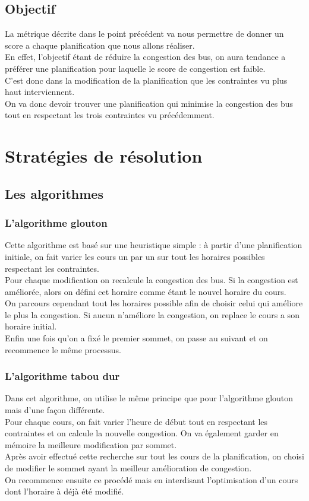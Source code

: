 \documentclass[a4paper,11pt]{article}
\begin{document}
	\subsection{Objectif}
		La métrique décrite dans le point précédent va nous permettre de donner un score a chaque planification que nous allons réaliser.\\
		En effet, l'objectif étant de réduire la congestion des bus, on aura tendance a préférer une planification pour laquelle le score de congestion est faible.\\
		C'est donc dans la modification de la planification que les contraintes vu plus haut interviennent.\\
		On va donc devoir trouver une planification qui minimise la congestion des bus tout en respectant les trois contraintes vu précédemment.
	
\section{Stratégies de résolution}
	\subsection{Les algorithmes}
		\subsubsection{L'algorithme glouton}
		Cette algorithme est basé sur une heuristique simple : à partir d'une planification initiale, on fait varier les cours un par un sur tout les horaires possibles respectant les contraintes.\\
		Pour chaque modification on recalcule la congestion des bus. Si la congestion est améliorée, alors on défini cet horaire comme étant le nouvel horaire du cours.\\
		On parcours cependant tout les horaires possible afin de choisir celui qui améliore le plus la congestion. Si aucun n'améliore la congestion, on replace le cours a son horaire initial.\\
		Enfin une fois qu'on a fixé le premier sommet, on passe au suivant et on recommence le même processus.
		\subsubsection{L'algorithme tabou dur}
		Dans cet algorithme, on utilise le même principe que pour l'algorithme glouton mais d'une façon différente.\\
		Pour chaque cours, on fait varier l'heure de début tout en respectant les contraintes et on calcule la nouvelle congestion. On va également garder en mémoire la meilleure modification par sommet.\\
		Après avoir effectué cette recherche sur tout les cours de la planification, on choisi de modifier le sommet ayant la meilleur amélioration de congestion.\\
		On recommence ensuite ce procédé mais en interdisant l'optimisation d'un cours dont l'horaire à déjà été modifié.
\end{document}
